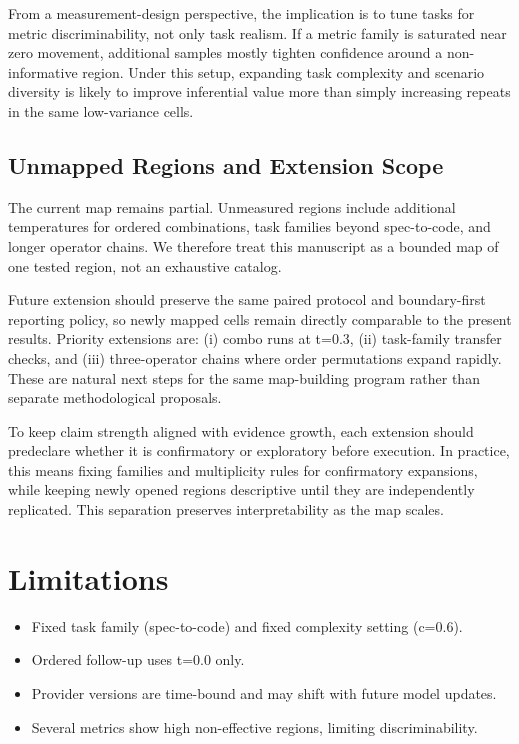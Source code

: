 \documentclass[11pt,a4paper]{article}
\begin{document}
From a measurement-design perspective, the implication is to tune tasks for metric discriminability, not only task realism. If a metric family is saturated near zero movement, additional samples mostly tighten confidence around a non-informative region. Under this setup, expanding task complexity and scenario diversity is likely to improve inferential value more than simply increasing repeats in the same low-variance cells.

\subsection{Unmapped Regions and Extension Scope}

The current map remains partial. Unmeasured regions include additional temperatures for ordered combinations, task families beyond spec-to-code, and longer operator chains. We therefore treat this manuscript as a bounded map of one tested region, not an exhaustive catalog.

Future extension should preserve the same paired protocol and boundary-first reporting policy, so newly mapped cells remain directly comparable to the present results. Priority extensions are: (i) combo runs at t=0.3, (ii) task-family transfer checks, and (iii) three-operator chains where order permutations expand rapidly. These are natural next steps for the same map-building program rather than separate methodological proposals.

To keep claim strength aligned with evidence growth, each extension should predeclare whether it is confirmatory or exploratory before execution. In practice, this means fixing families and multiplicity rules for confirmatory expansions, while keeping newly opened regions descriptive until they are independently replicated. This separation preserves interpretability as the map scales.

\section{Limitations}
\label{sec:limitations}

\begin{itemize}
  \item Fixed task family (spec-to-code) and fixed complexity setting (c=0.6).
  \item Ordered follow-up uses t=0.0 only.
  \item Provider versions are time-bound and may shift with future model updates.
  \item Several metrics show high non-effective regions, limiting discriminability.
\end{itemize}
\end{document}
